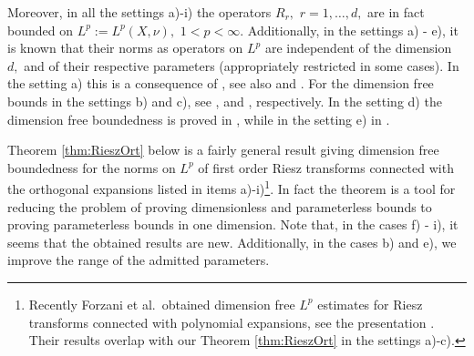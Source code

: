 \documentclass[leqno,12pt]{amsart}
\theoremstyle{definition}
\theoremstyle{remark}
\begin{document}
Moreover, in all the settings a)-i) the operators $R_r,$ $r=1,\ldots,d,$ are in fact bounded on $L^p:=L^p(X,\nu),$ $1<p<\infty.$ Additionally, in the settings a) - e), it is known that their norms as operators on $L^p$ are independent of the dimension $d,$ and of their respective parameters (appropriately restricted in some cases). In the setting a) this is a consequence of \cite{Mey1}, see also \cite{Gut1} and \cite{Pis1}. For the dimension free bounds in the settings b) and c), see \cite{No1}, and \cite{NSj2}, respectively. In the setting d) the dimension free boundedness is proved in \cite{HRST}, while in the setting e) in \cite{StWr}.

Theorem \ref{thm:RieszOrt} below is a fairly general result giving dimension free boundedness for the norms on $L^p$ of first order Riesz transforms connected with the orthogonal expansions listed in items a)-i)\footnote{Recently Forzani et al.\ obtained dimension free $L^p$ estimates for Riesz transforms connected with polynomial expansions, see the presentation \cite{SasForSc}. Their results overlap with our Theorem \ref{thm:RieszOrt} in the settings a)-c).}. In fact the theorem is a tool for reducing the problem of proving dimensionless and parameterless bounds to proving parameterless bounds in one dimension. Note that, in the cases f) - i), it seems that the obtained results are new. Additionally, in the cases b) and e), we improve the range of the admitted parameters.
\end{document}
